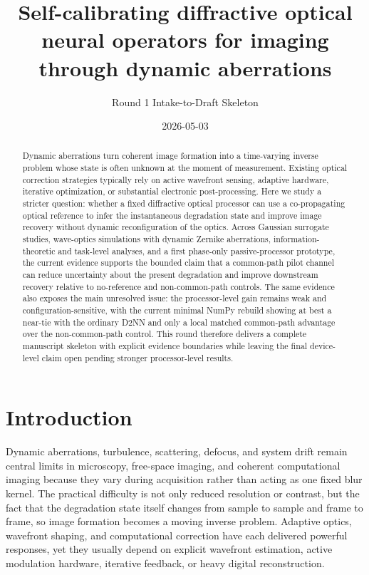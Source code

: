 \documentclass[11pt]{article}
\title{Self-calibrating diffractive optical neural operators for imaging through dynamic aberrations}
\author{Round 1 Intake-to-Draft Skeleton}
\date{2026-05-03}
\begin{document}
\maketitle

\begin{abstract}
Dynamic aberrations turn coherent image formation into a time-varying inverse problem whose state is often unknown at the moment of measurement. Existing optical correction strategies typically rely on active wavefront sensing, adaptive hardware, iterative optimization, or substantial electronic post-processing. Here we study a stricter question: whether a fixed diffractive optical processor can use a co-propagating optical reference to infer the instantaneous degradation state and improve image recovery without dynamic reconfiguration of the optics. Across Gaussian surrogate studies, wave-optics simulations with dynamic Zernike aberrations, information-theoretic and task-level analyses, and a first phase-only passive-processor prototype, the current evidence supports the bounded claim that a common-path pilot channel can reduce uncertainty about the present degradation and improve downstream recovery relative to no-reference and non-common-path controls. The same evidence also exposes the main unresolved issue: the processor-level gain remains weak and configuration-sensitive, with the current minimal NumPy rebuild showing at best a near-tie with the ordinary D2NN and only a local matched common-path advantage over the non-common-path control. This round therefore delivers a complete manuscript skeleton with explicit evidence boundaries while leaving the final device-level claim open pending stronger processor-level results.
\end{abstract}

\section{Introduction}
Dynamic aberrations, turbulence, scattering, defocus, and system drift remain central limits in microscopy, free-space imaging, and coherent computational imaging because they vary during acquisition rather than acting as one fixed blur kernel. The practical difficulty is not only reduced resolution or contrast, but the fact that the degradation state itself changes from sample to sample and frame to frame, so image formation becomes a moving inverse problem. Adaptive optics, wavefront shaping, and computational correction have each delivered powerful responses, yet they usually depend on explicit wavefront estimation, active modulation hardware, iterative feedback, or heavy digital reconstruction.
\end{document}
